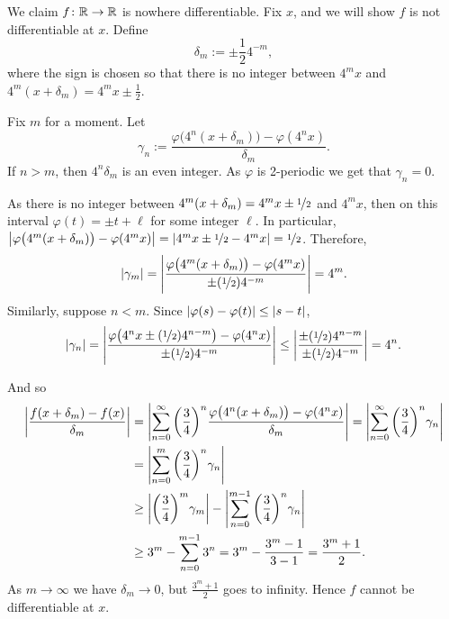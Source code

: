 \begin{example}
We claim $f \colon
{\mathbb{R}} \to {\mathbb{R}}$ is nowhere differentiable.
Fix $x$, and we will show $f$ is not differentiable at $x$.
Define
\begin{equation*}
\delta_m := \pm \frac{1}{2} 4^{-m} ,
\end{equation*}
where the sign is chosen so that there is no integer
between $4^m x$ and $4^m(x+\delta_m) = 4^m x \pm \frac{1}{2}$.

Fix $m$ for a moment.  Let
\begin{equation*}
\gamma_{n} :=
\frac{\varphi\bigl(4^n(x+\delta_m)\bigr)-\varphi(4^nx)}{\delta_m} .
\end{equation*}
If $n > m$, then $4^n\delta_m$ is an even integer.  As $\varphi$
is 2-periodic we get that $\gamma_n = 0$.

As there is no integer between 
$4^m(x+\delta_m) = 4^m x\pm\nicefrac{1}{2}$ and $4^m x$, then on this interval
$\varphi(t) = \pm t + \ell$ for some integer $\ell$.
In particular,
$\left\lvert {\varphi\bigl(4^m(x+ \delta_m)\bigr)-\varphi(4^mx)} \right\rvert =
\left\lvert {4^mx\pm\nicefrac{1}{2}-4^mx} \right\rvert = \nicefrac{1}{2}$.  Therefore,
\begin{equation*}
\lvert {\gamma_m} \rvert =
\left\lvert {
\frac{\varphi\bigl(4^m(x+\delta_m)\bigr)-\varphi(4^mx)}{\pm (\nicefrac{1}{2}) 4^{-m}}
} \right\rvert
= 4^m .
\end{equation*}
Similarly, suppose $n < m$.  Since $\lvert {\varphi(s) -\varphi(t)} \rvert \leq
\lvert {s-t} \rvert$,
\begin{equation*}
\lvert {\gamma_n} \rvert =
\left\lvert {\frac{\varphi\bigl(4^nx\pm(\nicefrac{1}{2})4^{n-m}\bigr)-\varphi(4^nx)}{\pm
(\nicefrac{1}{2}) 4^{-m}}} \right\rvert
\leq
\left\lvert {\frac{\pm(\nicefrac{1}{2})4^{n-m}}{\pm (\nicefrac{1}{2}) 4^{-m}}} \right\rvert = 4^n
.
\end{equation*}

And so
\begin{equation*}
\begin{split}
\left\lvert {
\frac{f(x+\delta_m)-f(x)}{\delta_m}
} \right\rvert
& =
\left\lvert {
\sum_{n=0}^\infty 
{\left(\frac{3}{4}\right)}^n
\frac{\varphi\bigl(4^n(x+\delta_m)\bigr)-\varphi(4^nx)}{\delta_m}
} \right\rvert
=
\left\lvert {
\sum_{n=0}^\infty 
{\left(\frac{3}{4}\right)}^n
\gamma_n
} \right\rvert
\\
& =
\left\lvert {
\sum_{n=0}^m 
{\left(\frac{3}{4}\right)}^n
\gamma_n
} \right\rvert
\\
& \geq
\left\lvert {
{\left(\frac{3}{4}\right)}^m
\gamma_m} \right\rvert
-
\left\lvert {
\sum_{n=0}^{m-1} 
{\left(\frac{3}{4}\right)}^n
\gamma_n
} \right\rvert
\\
& \geq
3^m
-
\sum_{n=0}^{m-1} 
3^n
=
3^m
-
\frac{3^{m}-1}{3-1}
=
\frac{3^m +1}{2} .
\end{split}
\end{equation*}
As $m \to \infty$ we have
$\delta_m \to 0$, but $\frac{3^m+1}{2}$
goes to infinity.  Hence $f$ cannot be differentiable at $x$.
\end{example}

